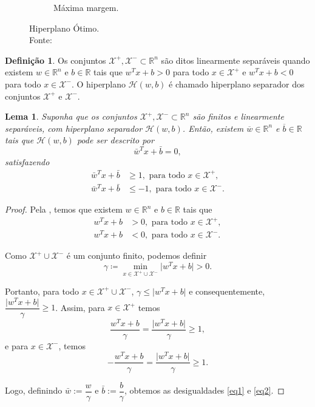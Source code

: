 \documentclass[12pt,a4paper]{scrartcl}
\def\Xset{\mathcal{X}}
\def\Hset{\mathcal{H}}
\def\RR{\mathds{R}}
\def\wbar{\bar{w}}
\def\bbar{\bar{b}}
\newtheorem{lema}{Lema}
\theoremstyle{definition}%
\newtheorem{defi}{Definição}
\begin{document}
\begin{figure}[hbtp]
\begin{subfigure}[h]{0.38\textwidth}
		\caption{Máxima margem. \label{fig3:b}}	
	\end{subfigure}
\caption{Hiperplano Ótimo. \label{fig3}
\\ Fonte: \textcite{Evelin2017}}
\end{figure}


\begin{defi} \label{def1} Os conjuntos $\Xset^{+}, \Xset^{-} \subset \RR^n$ são ditos linearmente separáveis quando existem $w\in \RR^n$ e $b\in \RR$  tais que $w^{T}x+b>0$ para todo $x\in \Xset^{+}$ e $w^{T}x+b<0$ para todo $x\in \Xset^{-}$. O hiperplano $\Hset(w,b)$ é chamado hiperplano separador dos conjuntos $\Xset^{+}$ e $\Xset^{-}$.
\end{defi}


\begin{lema} \label{lema1} Suponha que os conjuntos $\Xset^{+}, \Xset^{-} \subset \RR^n$ são finitos e linearmente separáveis, com hiperplano separador $\Hset(w,b)$. Então, existem $\overline{w}\in \RR^n$ e $\overline{b}\in \RR$ tais que $\Hset(w,b)$ pode ser descrito por
\[
\wbar^{T}x+\bbar =0,
\]
satisfazendo
\begin{align}
\wbar^{T}x+\bbar &\geq 1, \text{ para todo } x\in \Xset^{+}, \label{eq1} \\
\wbar^{T}x+\bbar &\leq -1, \text{ para todo } x\in \Xset^{-}. \label{eq2}
\end{align}
\end{lema} 

\begin{proof}
Pela  , temos que existem $w\in \RR^n$ e $b\in \RR$ tais que
\begin{align}
w^{T}x+b &>0, \text{ para todo } x\in \Xset^{+}, \\
w^{T}x+b &<0, \text{ para todo } x\in \Xset^{-}.
\end{align}  

Como $\Xset^{+}\cup \Xset^{-}$ é um conjunto finito, podemos definir
\[ \gamma \coloneqq \min_{x\in \Xset^{+}\cup \Xset^{-}} \vert w^{T}x+b\vert  >0. \]

Portanto, para todo $x\in \Xset^{+}\cup \Xset^{-}$, $\gamma \leq \vert w^{T}x+b\vert$ e consequentemente, $\dfrac{\vert w^{T}x+b\vert }{\gamma} \geq 1$. Assim, para $x\in \Xset^{+}$ temos
\[ \dfrac{w^{T}x+b}{\gamma} = \dfrac{\vert w^{T}x+b\vert }{\gamma} \geq 1, \]
e para $x\in \Xset^{-}$, temos
\[- \dfrac{w^{T}x+b}{\gamma} = \dfrac{\vert w^{T}x+b\vert }{\gamma} \geq 1. \]

Logo, definindo $\wbar:=\dfrac{w}{\gamma}$ e $\bbar :=\dfrac{b}{\gamma}$, obtemos as desigualdades \eqref{eq1} e \eqref{eq2}. 

\end{proof}
\end{document}
